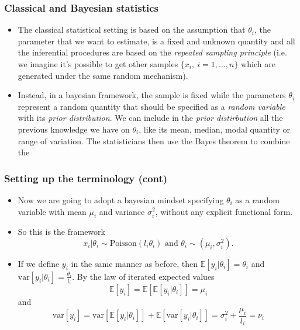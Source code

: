 \documentclass[c,10pt,pdftex]{beamer}
\begin{document}
\begin{frame}
\frametitle{Classical and Bayesian statistics}
\vspace{-0.75cm}
\begin{itemize}
	\setlength\itemsep{1em}
	\item The classical statistical setting is based on the assumption that $\theta_i$, the parameter that we want to estimate, is a fixed and unknown quantity and all the inferential procedures are based on the \textit{repeated sampling principle} (i.e. we imagine it's possible to get other samples $\lbrace x_i, \ i = 1,\dots,n \rbrace$ which are generated under the same random mechanism). 
	\item Instead, in a bayesian framework, the sample is fixed while the parameters $\theta_i$ represent a random quantity that should be specified as a \textit{random variable} with its \textit{prior distribution}. We can include in the \textit{prior distirbution} all the previous knowledge we have on $\theta_{i}$, like its mean, median, modal quantity or range of variation. The statisticians then use the Bayes theorem to combine the 
\end{itemize}
\end{frame}

\begin{frame}
\frametitle{Setting up the terminology (cont)}
\vspace{-0.75cm}
\begin{itemize}
	\setlength\itemsep{1em}
	\item Now we are going to adopt a bayesian mindset specifying $\theta_i$ as a random variable with mean $\mu_i$ and variance $\sigma^2_i$, without any explicit functional form. 
	
	\item So this is the framework 
	\[
	x_i | \theta_i \sim \text{Poisson}(l_i\theta_i) \text{ and } \theta_i \sim (\mu_i, \sigma^2_i). 
	\]  
	
	\item If we define $y_i$ in the same manner as before, then $\mathbb{E}[y_i | \theta_i] = \theta_i$ and $\text{var}[y_i | \theta_i] = \frac{\theta_{i}}{l_i}$. By the law of iterated expected values 
	\[
	\mathbb{E}[y_i] = \mathbb{E}[\mathbb{E}[y_i|\theta_{i}]] = \mu_i
	\]
	and
	\[
	\text{var}[y_i] = \text{var}[\mathbb{E}[y_i | \theta_i]] + \mathbb{E}[\text{var}[y_i|\theta_{i}]] = \sigma^2_i + \frac{\mu_i}{l_i} = \nu_i
	\]
\end{itemize}
\end{frame}
\end{document}
